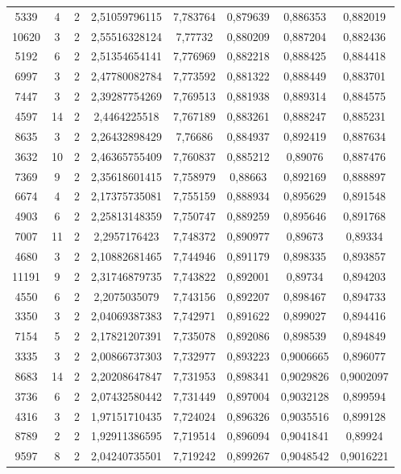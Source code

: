 \begin{longtable}{|c|c|c|c|c|c|c|c|}
5339 & 4 & 2 & 2,51059796115 & 7,783764 & 0,879639 & 0,886353 & 0,882019 \\
10620 & 3 & 2 & 2,55516328124 & 7,77732 & 0,880209 & 0,887204 & 0,882436 \\
5192 & 6 & 2 & 2,51354654141 & 7,776969 & 0,882218 & 0,888425 & 0,884418 \\
6997 & 3 & 2 & 2,47780082784 & 7,773592 & 0,881322 & 0,888449 & 0,883701 \\
7447 & 3 & 2 & 2,39287754269 & 7,769513 & 0,881938 & 0,889314 & 0,884575 \\
4597 & 14 & 2 & 2,4464225518 & 7,767189 & 0,883261 & 0,888247 & 0,885231 \\
8635 & 3 & 2 & 2,26432898429 & 7,76686 & 0,884937 & 0,892419 & 0,887634 \\
3632 & 10 & 2 & 2,46365755409 & 7,760837 & 0,885212 & 0,89076 & 0,887476 \\
7369 & 9 & 2 & 2,35618601415 & 7,758979 & 0,88663 & 0,892169 & 0,888897 \\
6674 & 4 & 2 & 2,17375735081 & 7,755159 & 0,888934 & 0,895629 & 0,891548 \\
4903 & 6 & 2 & 2,25813148359 & 7,750747 & 0,889259 & 0,895646 & 0,891768 \\
7007 & 11 & 2 & 2,2957176423 & 7,748372 & 0,890977 & 0,89673 & 0,89334 \\
4680 & 3 & 2 & 2,10882681465 & 7,744946 & 0,891179 & 0,898335 & 0,893857 \\
11191 & 9 & 2 & 2,31746879735 & 7,743822 & 0,892001 & 0,89734 & 0,894203 \\
4550 & 6 & 2 & 2,2075035079 & 7,743156 & 0,892207 & 0,898467 & 0,894733 \\
3350 & 3 & 2 & 2,04069387383 & 7,742971 & 0,891622 & 0,899027 & 0,894416 \\
7154 & 5 & 2 & 2,17821207391 & 7,735078 & 0,892086 & 0,898539 & 0,894849 \\
3335 & 3 & 2 & 2,00866737303 & 7,732977 & 0,893223 & 0,9006665 & 0,896077 \\
8683 & 14 & 2 & 2,20208647847 & 7,731953 & 0,898341 & 0,9029826 & 0,9002097 \\
3736 & 6 & 2 & 2,07432580442 & 7,731449 & 0,897004 & 0,9032128 & 0,899594 \\
4316 & 3 & 2 & 1,97151710435 & 7,724024 & 0,896326 & 0,9035516 & 0,899128 \\
8789 & 2 & 2 & 1,92911386595 & 7,719514 & 0,896094 & 0,9041841 & 0,89924 \\
9597 & 8 & 2 & 2,04240735501 & 7,719242 & 0,899267 & 0,9048542 & 0,9016221 \\

\end{longtable}
